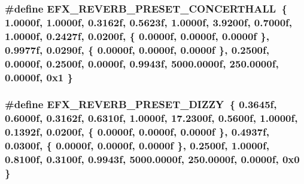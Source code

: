 \subsubsection[{\texorpdfstring{E\+F\+X\+\_\+\+R\+E\+V\+E\+R\+B\+\_\+\+P\+R\+E\+S\+E\+T\+\_\+\+C\+O\+N\+C\+E\+R\+T\+H\+A\+LL}{EFX_REVERB_PRESET_CONCERTHALL}}]{\setlength{\rightskip}{0pt plus 5cm}\#define E\+F\+X\+\_\+\+R\+E\+V\+E\+R\+B\+\_\+\+P\+R\+E\+S\+E\+T\+\_\+\+C\+O\+N\+C\+E\+R\+T\+H\+A\+LL~\{ 1.\+0000f, 1.\+0000f, 0.\+3162f, 0.\+5623f, 1.\+0000f, 3.\+9200f, 0.\+7000f, 1.\+0000f, 0.\+2427f, 0.\+0200f, \{ 0.\+0000f, 0.\+0000f, 0.\+0000f \}, 0.\+9977f, 0.\+0290f, \{ 0.\+0000f, 0.\+0000f, 0.\+0000f \}, 0.\+2500f, 0.\+0000f, 0.\+2500f, 0.\+0000f, 0.\+9943f, 5000.\+0000f, 250.\+0000f, 0.\+0000f, 0x1 \}}\hypertarget{efx-presets_8h_a56733ee2e8ebe8ef49edcae1a9d5285f}{}\label{efx-presets_8h_a56733ee2e8ebe8ef49edcae1a9d5285f}
\subsubsection[{\texorpdfstring{E\+F\+X\+\_\+\+R\+E\+V\+E\+R\+B\+\_\+\+P\+R\+E\+S\+E\+T\+\_\+\+D\+I\+Z\+ZY}{EFX_REVERB_PRESET_DIZZY}}]{\setlength{\rightskip}{0pt plus 5cm}\#define E\+F\+X\+\_\+\+R\+E\+V\+E\+R\+B\+\_\+\+P\+R\+E\+S\+E\+T\+\_\+\+D\+I\+Z\+ZY~\{ 0.\+3645f, 0.\+6000f, 0.\+3162f, 0.\+6310f, 1.\+0000f, 17.\+2300f, 0.\+5600f, 1.\+0000f, 0.\+1392f, 0.\+0200f, \{ 0.\+0000f, 0.\+0000f, 0.\+0000f \}, 0.\+4937f, 0.\+0300f, \{ 0.\+0000f, 0.\+0000f, 0.\+0000f \}, 0.\+2500f, 1.\+0000f, 0.\+8100f, 0.\+3100f, 0.\+9943f, 5000.\+0000f, 250.\+0000f, 0.\+0000f, 0x0 \}}\hypertarget{efx-presets_8h_afae1b7284621db910ef4f29390640cd8}{}\label{efx-presets_8h_afae1b7284621db910ef4f29390640cd8}

